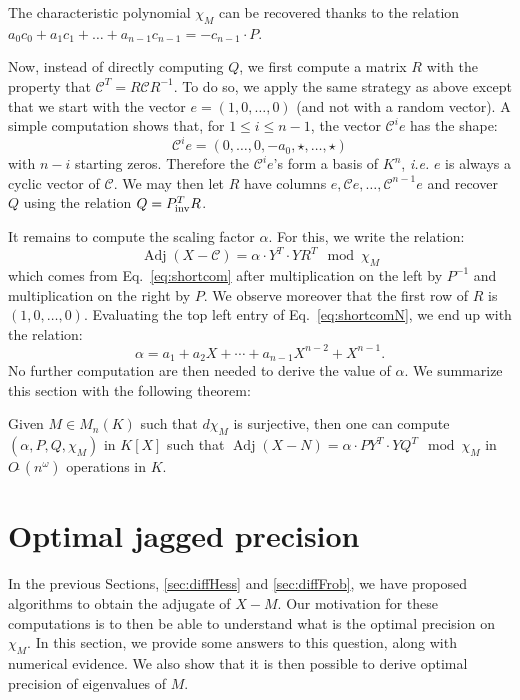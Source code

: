 \documentclass{sig-alternate-05-2015}
\DeclareMathOperator{\adj}{Adj}
\newcommand{\softO}{O\tilde{~}}
\newcommand{\inv}{\text{\rm inv}}
\begin{document}
The characteristic polynomial $\chi_M$ can be recovered thanks to the
relation $a_0c_0 + a_1c_1 + \dots + a_{n-1}c_{n-1} = -c_{n-1} \cdot P$.

Now, instead of directly computing $Q$, we first compute a matrix $R$ 
with the property that $\mathscr{C}^T = R \mathscr{C} R^{-1}$. To do so,
we apply the same strategy as above except that we start with the vector
$e = (1, 0, \ldots, 0)$ (and not with a random vector). A simple computation shows
that, for $1 \leq i \leq n{-}1$, the vector $\mathscr{C}^i e$ has the shape:
$$\mathscr{C}^i e = (0, \ldots, 0, -a_0, \star, \ldots, \star)$$
with $n{-}i$ starting zeros. Therefore the $\mathscr{C}^i e$'s form a basis of
$K^n$, \emph{i.e.} $e$ is always a cyclic vector of $\mathscr{C}$.
We may then let $R$ have columns $e, \mathscr{C}e, \dots, \mathscr{C}^{n-1}e$
and recover $Q$ using the relation $Q = P_\inv^T R$.

It remains to compute the scaling factor $\alpha$. For this, we write
the relation:
\begin{equation}
\label{eq:shortcomN}
\adj(X{-}\mathscr{C}) = \alpha \cdot Y^T \cdot Y R^T \mod \chi_M
\end{equation}
which comes from Eq.~\eqref{eq:shortcom} after multiplication on the 
left by $P^{-1}$ and multiplication on the right by $P$. We observe
moreover that the first row of $R$ is $(1, 0, \ldots, 0)$. Evaluating
the top left entry of Eq.~\eqref{eq:shortcomN}, we end up with the 
relation:
$$\alpha = a_1 + a_2 X + \cdots + a_{n-1} X^{n-2} + X^{n-1}.$$
No further computation are then needed to derive the value of $\alpha$.
We summarize this section with the following theorem:

\begin{theo}
\label{thm:compute_shortcom}
Given $M \in M_n(K)$ such that $d \chi_M$ is surjective,
then one can compute $(\alpha, P, Q, \chi_M)$
in $K[X]$ such that
$\adj(X{-}N) = \alpha \cdot P Y^T \cdot Y Q^T \mod \chi_M$
in $\softO(n^\omega)$ operations in $K.$
\end{theo}

\section{Optimal jagged precision}
\label{sec:optjagged}

In the previous Sections, \ref{sec:diffHess} and \ref{sec:diffFrob},
we have proposed algorithms to obtain the adjugate of 
$X-M.$ Our motivation for these computations is to then
be able to understand what is the optimal precision on $\chi_M.$
In this section, we provide some answers to this question,
along with numerical evidence.
We also show that it is then possible to derive 
optimal precision of eigenvalues of $M.$ 
\end{document}
